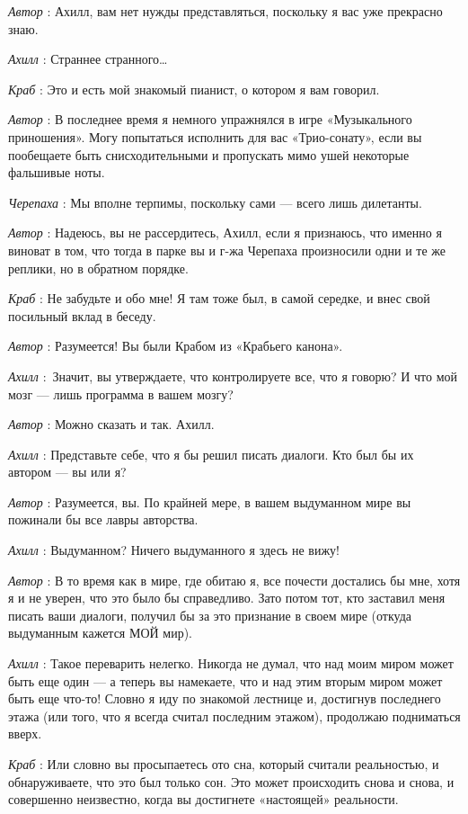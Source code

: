 \emph{Автор} : Ахилл, вам нет нужды представляться, поскольку я вас уже прекрасно знаю.

\emph{Ахилл} : Страннее странного\ldots{}

\emph{Краб} : Это и есть мой знакомый пианист, о котором я вам говорил.

\emph{Автор} : В последнее время я немного упражнялся в игре «Музыкального приношения». Могу попытаться исполнить для вас «Трио-сонату», если вы пообещаете быть снисходительными и пропускать мимо ушей некоторые фальшивые ноты.

\emph{Черепаха} : Мы вполне терпимы, поскольку сами --- всего лишь дилетанты.

\emph{Автор} : Надеюсь, вы не рассердитесь, Ахилл, если я признаюсь, что именно я виноват в том, что тогда в парке вы и г-жа Черепаха произносили одни и те же реплики, но в обратном порядке.

\emph{Краб} : Не забудьте и обо мне! Я там тоже был, в самой середке, и внес свой посильный вклад в беседу.

\emph{Автор} : Разумеется! Вы были Крабом из «Крабьего канона».

\emph{Ахилл} :~Значит, вы утверждаете, что контролируете все, что я говорю? И что мой мозг --- лишь программа в вашем мозгу?

\emph{Автор} : Можно сказать и так. Ахилл.

\emph{Ахилл} : Представьте себе, что я бы решил писать диалоги. Кто был бы их автором --- вы или я?

\emph{Автор} : Разумеется, вы. По крайней мере, в вашем выдуманном мире вы пожинали бы все лавры авторства.

\emph{Ахилл} : Выдуманном? Ничего выдуманного я здесь не вижу!

\emph{Автор} : В то время как в мире, где обитаю я, все почести достались бы мне, хотя я и не уверен, что это было бы справедливо. Зато потом тот, кто заставил меня писать ваши диалоги, получил бы за это признание в своем мире (откуда выдуманным кажется МОЙ мир).

\emph{Ахилл} : Такое переварить нелегко. Никогда не думал, что над моим миром может быть еще один --- а теперь вы намекаете, что и над этим вторым миром может быть еще что-то! Словно я иду по знакомой лестнице и, достигнув последнего этажа (или того, что я всегда считал последним этажом), продолжаю подниматься вверх.

\emph{Краб} : Или словно вы просыпаетесь ото сна, который считали реальностью, и обнаруживаете, что это был только сон. Это может происходить снова и снова, и совершенно неизвестно, когда вы достигнете «настоящей» реальности.

